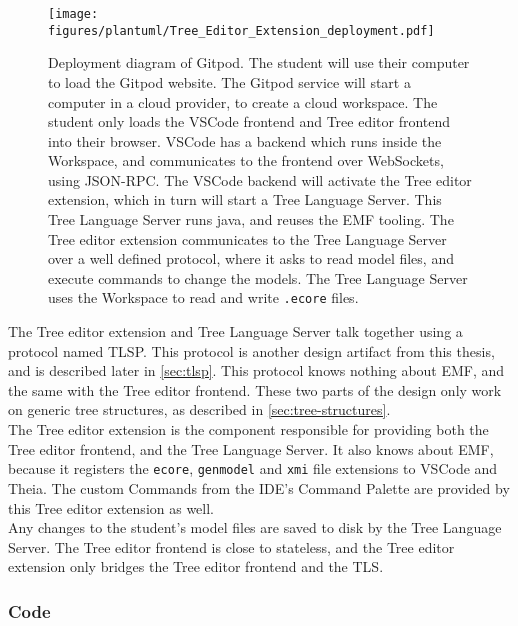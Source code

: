 \begin{figure}[H]  %
  \centering
  \texttt{[image: figures/plantuml/Tree\_Editor\_Extension\_deployment.pdf]}
  \caption[Gitpod deployment diagram]{Deployment diagram of Gitpod. The student will use their computer to load the Gitpod website.
  The Gitpod service will start a computer in a cloud provider, to create a cloud workspace.
  The student only loads the VSCode frontend and Tree editor frontend into their browser.
  VSCode has a backend which runs inside the Workspace, and communicates to the frontend over WebSockets, using JSON-RPC\@.
  The VSCode backend will activate the Tree editor extension, which in turn will start a Tree Language Server.
  This Tree Language Server runs java, and reuses the \acrshort{EMF} tooling.
  The Tree editor extension communicates to the Tree Language Server over a well defined protocol, where it asks to read model files, and execute commands to change the models.
  The Tree Language Server uses the Workspace to read and write \texttt{.ecore} files.}\label{fig:gitpod-deployment-diagram}
\end{figure}

The Tree editor extension and Tree Language Server talk together using a protocol named \acrfull{TLSP}.
This protocol is another design artifact from this thesis, and is described later in \cref{sec:tlsp}.
This protocol knows nothing about \acrshort{EMF}, and the same with the Tree editor frontend.
These two parts of the design only work on generic tree structures, as described in \cref{sec:tree-structures}.\\

The Tree editor extension is the component responsible for providing both the Tree editor frontend, and the Tree Language Server.
It also knows about \acrshort{EMF}, because it registers the \texttt{ecore}, \texttt{genmodel} and \texttt{xmi} file extensions to \gls{VSCode} and \gls{Theia}.
The custom Commands from the \acrshort{IDE}'s Command Palette are provided by this Tree editor extension as well.\\

Any changes to the student's model files are saved to disk by the Tree Language Server.
The Tree editor frontend is close to stateless, and the Tree editor extension only bridges the Tree editor frontend and the TLS.

\subsubsection{Code}

